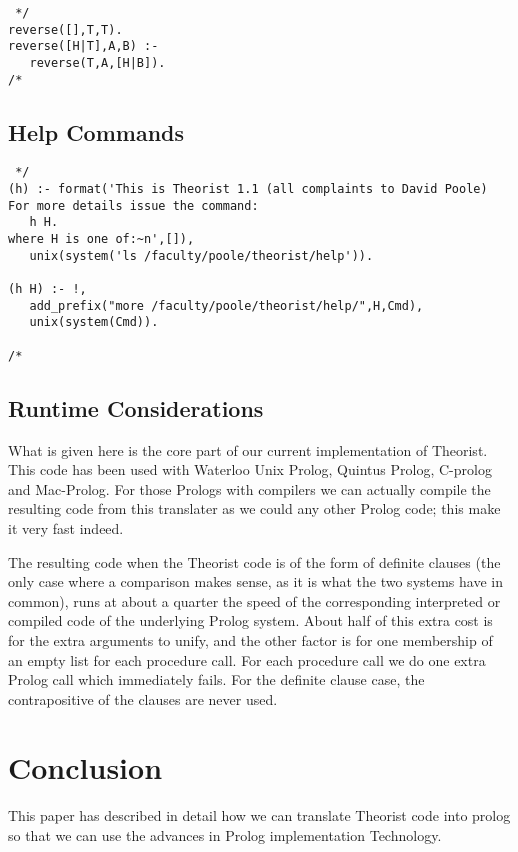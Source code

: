 \begin{verbatim} */
reverse([],T,T).
reverse([H|T],A,B) :-
   reverse(T,A,[H|B]).
/* \end{verbatim}

\subsection{Help Commands}
\begin{verbatim} */
(h) :- format('This is Theorist 1.1 (all complaints to David Poole)
For more details issue the command:
   h H.
where H is one of:~n',[]),
   unix(system('ls /faculty/poole/theorist/help')).

(h H) :- !,
   add_prefix("more /faculty/poole/theorist/help/",H,Cmd),
   unix(system(Cmd)).

/* \end{verbatim}

\subsection{Runtime Considerations}
What is given here is the core part of our current implementation of
Theorist.
This code has been used with Waterloo Unix Prolog, Quintus Prolog,
C-prolog and Mac-Prolog.
For those Prologs with compilers we can actually compile the resulting
code from this translater as we could any other Prolog code;
this make it very fast indeed.

The resulting code when the Theorist code is of the form of definite clauses 
(the only case where a comparison makes sense,
as it is what the two systems have in common), runs at about a quarter
the speed
of the corresponding interpreted or compiled code of the underlying
Prolog system. About half of this extra cost is
for the extra arguments to unify,
and the other factor is for one membership
of an empty list for each procedure call.
For each procedure call we do one extra Prolog call which immediately fails.
For the definite clause case, the contrapositive of the clauses are never used.
\section{Conclusion}
This paper has described in detail how we can translate Theorist code into
prolog so that we can use the advances in Prolog implementation Technology.

